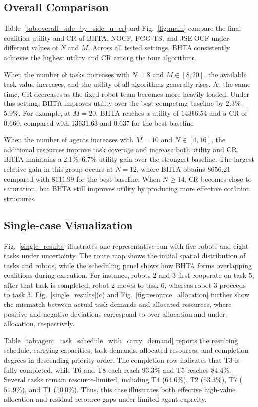 \documentclass[journal,twoside,web]{ieeecolor}
\begin{document}
\subsection{Overall Comparison}

Table~\ref{tab:overall_side_by_side_u_cr} and Fig.~\ref{fig:main} compare the final coalition utility and CR of BHTA, NOCF, PGG-TS, and JSE-OCF under different values of $N$ and $M$. Across all tested settings, BHTA consistently achieves the highest utility and CR among the four algorithms.

When the number of tasks increases with $N=8$ and $M\in[8,20]$, the available task value increases, and the utility of all algorithms generally rises. At the same time, CR decreases as the fixed robot team becomes more heavily loaded. Under this setting, BHTA improves utility over the best competing baseline by 2.3\%--5.9\%. For example, at $M=20$, BHTA reaches a utility of $14366.54$ and a CR of $0.660$, compared with $13631.63$ and $0.637$ for the best baseline.

When the number of agents increases with $M=10$ and $N\in[4,16]$, the additional resources improve task coverage and increase both utility and CR. BHTA maintains a 2.1\%--6.7\% utility gain over the strongest baseline. The largest relative gain in this group occurs at $N=12$, where BHTA obtains $8656.21$ compared with $8111.99$ for the best baseline. When $N\ge14$, CR becomes close to saturation, but BHTA still improves utility by producing more effective coalition structures.

\subsection{Single-case Visualization}

Fig.~\ref{single_results} illustrates one representative run with five robots and eight tasks under uncertainty. The route map shows the initial spatial distribution of tasks and robots, while the scheduling panel shows how BHTA forms overlapping coalitions during execution. For instance, robots 2 and 3 first cooperate on task 5; after that task is completed, robot 2 moves to task 6, whereas robot 3 proceeds to task 3. Fig.~\ref{single_results}(c) and Fig.~\ref{fig:resource_allocation} further show the mismatch between actual task demands and allocated resources, where positive and negative deviations correspond to over-allocation and under-allocation, respectively.

Table~\ref{tab:agent_task_schedule_with_carry_demand} reports the resulting schedule, carrying capacities, task demands, allocated resources, and completion degrees in descending priority order. The completion row indicates that T3 is fully completed, while T6 and T8 each reach $93.3\%$ and T5 reaches $84.4\%$. Several tasks remain resource-limited, including T4 ($64.6\%$), T2 ($53.3\%$), T7 ($51.9\%$), and T1 ($50.0\%$). Thus, this case illustrates both effective high-value allocation and residual resource gaps under limited agent capacity.
\end{document}
